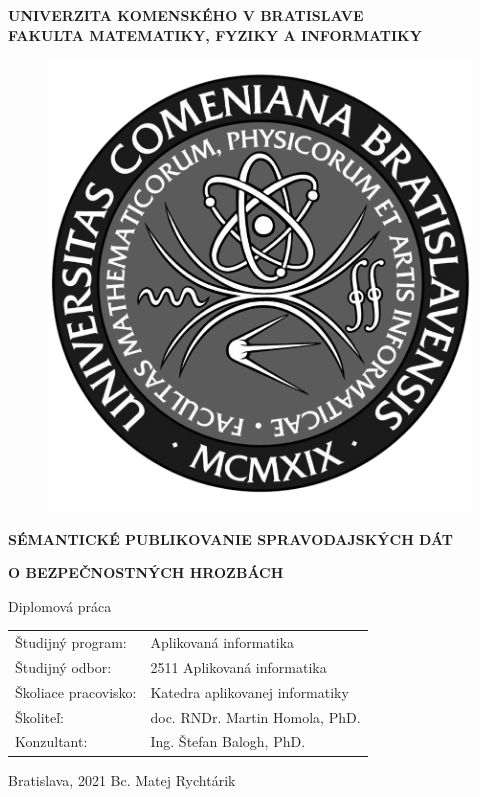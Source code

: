 \documentclass[12pt, a4paper, oneside]{book}
\newcommand\mftitle{Sémantické publikovanie spravodajských dát}
\newcommand\mftitlen{o bezpečnostných hrozbách}
\newcommand\mfthesistype{Diplomová práca}
\newcommand\mfauthor{Bc. Matej Rychtárik}
\newcommand\mfadvisor{doc. RNDr. Martin Homola, PhD.}
\newcommand\mfconsultant{Ing. Štefan Balogh, PhD.}
\newcommand\mfplacedate{Bratislava, 2021}
\newcommand\mfuniversity{UNIVERZITA KOMENSKÉHO V BRATISLAVE}
\newcommand\mffaculty{FAKULTA MATEMATIKY, FYZIKY A INFORMATIKY}
\begin{document}
\noindent
\begin{minipage}{\textwidth}
\begin{center}
\textbf{\mfuniversity \\
\mffaculty}
\end{center}
\end{minipage}

\vfill
\begin{figure}[!hbt]
\begin{center}
\includegraphics{images/logo_fmph_dark}
\label{img:logo_dark}
\end{center}
\end{figure}
\begin{center}
\begin{minipage}{0.8\textwidth}
\centerline{\textbf{\Large\MakeUppercase{\mftitle}}}
\centerline{\textbf{\Large\MakeUppercase{\mftitlen}}}
\smallskip
\centerline{\mfthesistype}
\end{minipage}
\end{center}
\vfill
\begin{tabular}{l l}
Študijný program: & Aplikovaná informatika\\
Študijný odbor: & 2511 Aplikovaná informatika\\
Školiace pracovisko: & Katedra aplikovanej informatiky\\
Školiteľ: & \mfadvisor \\
Konzultant: & \mfconsultant
\end{tabular}
\vfill
\noindent
\mfplacedate \hfill
\mfauthor
\eject 
\end{document}
